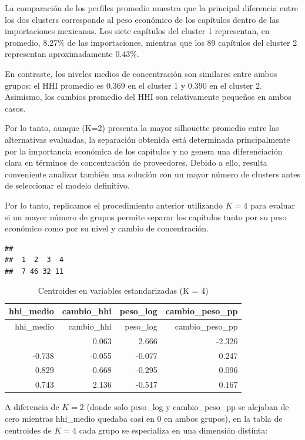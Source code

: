 \documentclass[
]{article}
\begin{document}
La comparación de los perfiles promedio muestra que la principal
diferencia entre los dos clusters corresponde al peso económico de los
capítulos dentro de las importaciones mexicanas. Los siete capítulos del
cluster 1 representan, en promedio, 8.27\% de las importaciones,
mientras que los 89 capítulos del cluster 2 representan aproximadamente
0.43\%.

En contraste, los niveles medios de concentración son similares entre
ambos grupos: el HHI promedio es 0.369 en el cluster 1 y 0.390 en el
cluster 2. Asimismo, los cambios promedio del HHI son relativamente
pequeños en ambos casos.

Por lo tanto, aunque (K=2) presenta la mayor silhouette promedio entre
las alternativas evaluadas, la separación obtenida está determinada
principalmente por la importancia económica de los capítulos y no genera
una diferenciación clara en términos de concentración de proveedores.
Debido a ello, resulta conveniente analizar también una solución con un
mayor número de clusters antes de seleccionar el modelo definitivo.

Por lo tanto, replicamos el procedimiento anterior utilizando \(K=4\)
para evaluar si un mayor número de grupos permite separar los capítulos
tanto por su peso económico como por su nivel y cambio de concentración.

\begin{verbatim}
## 
##  1  2  3  4 
##  7 46 32 11
\end{verbatim}

\begin{longtable}[]{@{}rrrr@{}}
\caption{Centroides en variables estandarizadas (K = 4)}\tabularnewline
\toprule\noalign{}
hhi\_medio & cambio\_hhi & peso\_log & cambio\_peso\_pp \\
\midrule\noalign{}
\endfirsthead
\toprule\noalign{}
hhi\_medio & cambio\_hhi & peso\_log & cambio\_peso\_pp \\
\midrule\noalign{}
\endhead
\bottomrule\noalign{}
\endlastfoot
-0.110 & 0.063 & 2.666 & -2.326 \\
-0.738 & -0.055 & -0.077 & 0.247 \\
0.829 & -0.668 & -0.295 & 0.096 \\
0.743 & 2.136 & -0.517 & 0.167 \\
\end{longtable}

A diferencia de \(K=2\) (donde solo peso\_log y cambio\_peso\_pp se
alejaban de cero mientras hhi\_medio quedaba casi en 0 en ambos grupos),
en la tabla de centroides de \(K=4\) cada grupo se especializa en una
dimensión distinta:
\end{document}

